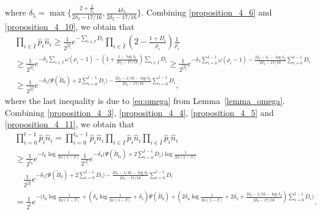 \documentclass[11pt,letterpaper]{article}
\newcommand\0{{\Vector{0}}}
\newcommand\1{{\Vector{1}}}
\numberwithin{assumption}{section}
\numberwithin{definition}{section}
\numberwithin{theorem}{section}
\numberwithin{remark}{section}
\begin{document}
    where $\delta_5 = \max\{\frac{2 + \frac{2}{\delta_2}}{2\delta_2 - 17/16}, \frac{4\delta_3}{2\delta_2 - 17/16}\}$. Combining \eqref{proposition_4_6} and \eqref{proposition_4_10}, we obtain that
    \begin{equation}\label{proposition_4_11}
    \begin{split}
        & \prod_{i \in \bar{I}} \hat{p}_i\hat{n}_i \geq \frac{1}{2^{|\bar{I}|}}e^{-\sum_{i \in \bar{I}}D_i}\prod_{i \in \bar{I}}(2 - \frac{1 + D_i}{\rho_i})\frac{1}{\rho_i} \\
        & \geq \frac{1}{2^{|\bar{I}|}}e^{- \delta_5\sum_{i \in \bar{I}}\omega(\rho_i - 1) - (1 + \frac{1 - \log{\delta_2}}{2\delta_2 - 17/16})\sum_{i \in \bar{I}}D_i} \geq \frac{1}{2^{|\bar{I}|}}e^{- \delta_5\sum_{i = 0}^{t - 1}\omega(\rho_i - 1) - \frac{2\delta_2 - \delta_1 - \log{\delta_2}}{2\delta_2 - 17/16}\sum_{i = 0}^{t - 1}D_i} \\
        & \geq \frac{1}{2^{|\bar{I}|}}e^{- \delta_5\Big(\Psi(\tilde{B}_{0}) + 2\sum_{i = 0}^{t - 1}D_i\Big) - \frac{2\delta_2 - 1/16 - \log{\delta_2}}{2\delta_2 - 17/16}\sum_{i = 0}^{t - 1}D_i},
    \end{split}
    \end{equation}
    where the last inequality is due to \eqref{eq:omega} from Lemma~\ref{lemma_omega}. Combining \eqref{proposition_4_3}, \eqref{proposition_4_4}, \eqref{proposition_4_5} and \eqref{proposition_4_11}, we obtain that
    \begin{equation}\label{proposition_4_12}
    \begin{split}
        & \prod_{i = 0}^{t - 1} \hat{p}_i\hat{n}_i = \prod_{i = 0}^{t_0 - 1} \hat{p}_i\hat{n}_i\prod_{i \in I} \hat{p}_i\hat{n}_i \prod_{i \in \bar{I}} \hat{p}_i\hat{n}_i \\
        & \geq \frac{1}{2^{t_0}}e^{-t_0\log{\frac{1}{2\alpha(1 - \beta)}}}\frac{1}{2^{|I|}}e^{-\delta_4\Big(\Psi(\tilde{B}_{t_0}) + 2\sum_{i = 0}^{t - 1}D_i\Big)\log{\frac{1}{2\alpha(1 - \beta)}}} \\
        & \quad \frac{1}{2^{|\bar{I}|}}e^{- \delta_5\Big(\Psi(\tilde{B}_{0}) + 2\sum_{i = 0}^{t - 1}D_i\Big) - \frac{2\delta_2 - 1/16 - \log{\delta_2}}{2\delta_2 - 17/16}\sum_{i = 0}^{t - 1}D_i} \\
        & = \frac{1}{2^t}e^{-\Big(t_0\log{\frac{1}{2\alpha(1 - \beta)}} + (\delta_4\log{\frac{1}{2\alpha(1 - \beta)}} + \delta_5) \Psi(\tilde{B}_{0}) + (2\delta_4\log{\frac{1}{2\alpha(1 - \beta)}} + 2\delta_5 + \frac{2\delta_2 - 1/16 - \log{\delta_2}}{2\delta_2 - 17/16})\sum_{i = 0}^{t - 1}D_i \Big)}.
    \end{split}
    \end{equation}
\end{document}
